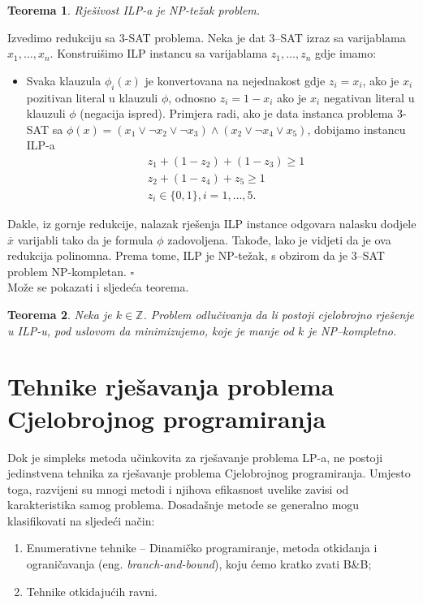 \documentclass[a4paper, utf8, 11pt, colorlinks]{article}
\newtheorem{thm}{Teorema}
\newenvironment{proof}{{Dokaz:}}{\hfill$\square$}
\begin{document}
   \begin{thm}
   	  Rješivost ILP-a je NP-težak problem.
   \end{thm}
   \begin{proof}
   	   Izvedimo redukciju sa 3-SAT problema. Neka je dat 3--SAT izraz sa varijablama 
   	   $x_1,\ldots, x_n$.  Konstruišimo ILP instancu sa varijablama $z_1, \ldots, z_n$ gdje imamo:
   	   \begin{itemize}
   	   	   \item Svaka klauzula $\phi_i(x)$ je konvertovana na nejednakost gdje
   	   	      $z_i = x_i$, ako je $x_i$ pozitivan literal u klauzuli $\phi$, odnosno $z_i = 1 - x_i$ ako je $x_i$ negativan literal u klauzuli $\phi$ (negacija ispred). Primjera radi, ako je data instanca problema 3-SAT sa 
   	   	      $\phi(x) = (x_1 \vee \neg x_2 \vee \neg x_3) \wedge ( x_2 \vee \neg x_4 \vee x_5 )$, dobijamo instancu ILP-a
   	   	      \begin{align*}
   	   	         	 &z_1 + (1- z_2) + (1 - z_3 ) \geq 1 \\
   	   	         	 &z_2 + (1-z_4)  + z_5 \geq 1 \\
   	   	         	 & z_i \in \{0,1\}, i=1,\ldots,5.
   	   	      \end{align*} 
   	   \end{itemize}
   	   Dakle, iz gornje redukcije, nalazak rješenja ILP instance odgovara nalasku dodjele $\overline{x}$ varijabli tako da je formula $\phi$ zadovoljena. Takođe, lako je vidjeti da je ova redukcija polinomna. Prema tome, ILP je NP-težak, s obzirom da je 3--SAT problem NP-kompletan. 
   \end{proof} \\
 Može se pokazati i sljedeća teorema.
 \begin{thm} Neka je $k\in \mathbb{Z}$.
 	 Problem odlučivanja da li postoji cjelobrojno rješenje u ILP-u, pod uslovom da minimizujemo, koje je manje od $k$ je NP--kompletno. 
 \end{thm}


 \newpage 
 \section{Tehnike rješavanja problema Cjelobrojnog programiranja}
 
 Dok je simpleks metoda učinkovita za rješavanje  problema LP-a, ne postoji jedinstvena tehnika za rješavanje problema Cjelobrojnog programiranja. Umjesto toga, razvijeni su mnogi metodi i njihova efikasnost
 uvelike zavisi od karakteristika samog problema. Dosadašnje metode se generalno mogu klasifikovati na sljedeći način:
 \begin{enumerate}
     \item Enumerativne tehnike -- Dinamičko programiranje, metoda otkidanja i ograničavanja (eng. \emph{branch-and-bound}), koju ćemo kratko zvati B\&B;
     \item Tehnike otkidajućih ravni.
 \end{enumerate}
\end{document}
